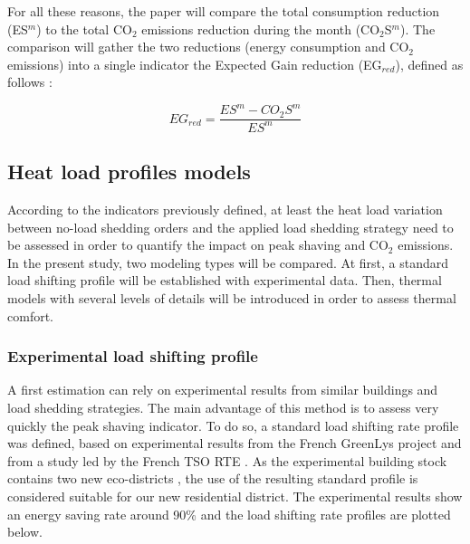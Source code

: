 \documentclass[buildings,article,submit,moreauthors,pdftex,10pt,a4paper]{mdpi}
\theoremstyle{mdpi}
\newcounter{ex}
\newcounter{re}
\theoremstyle{mdpidefinition}
\begin{document}
For all these reasons, the paper will compare the total consumption reduction (ES$^{m}$) to the total CO$_{2}$ emissions reduction during the month (CO$_2$S$^{m}$). The comparison will gather the two reductions (energy consumption and CO$_2$ emissions) into a single indicator the Expected Gain reduction (EG$_{red}$), defined as follows :

\begin{equation}
    EG_{red} = \frac{ES^{m} - CO_{2}S^{m}}{ES^{m}}
\end{equation}


\subsection{Heat load profiles models}
According to the indicators previously defined, at least the heat load variation between no-load shedding orders and the applied load shedding strategy need to be assessed in order to quantify the impact on peak shaving and CO$_2$ emissions. In the present study, two modeling types will be compared. At first, a standard load shifting profile will be established with experimental data. Then, thermal models with several levels of details will be introduced in order to assess thermal comfort. 

\subsubsection{Experimental load shifting profile}
A first estimation can rely on experimental results from similar buildings and load shedding strategies. The main advantage of this method is to assess very quickly the peak shaving indicator.
To do so, a standard load shifting rate profile was defined, based on experimental results from the French GreenLys project \cite{noauthor_annuaire_nodate} 
and from a study led by the French TSO RTE \cite{RTE_rapport_report}.
As the experimental building stock contains two new eco-districts \cite{noauthor_annuaire_nodate}, the use of the resulting standard profile is considered suitable for our new residential district. The experimental results show an energy saving rate around 90\% and the load shifting rate profiles are plotted below.
\end{document}
